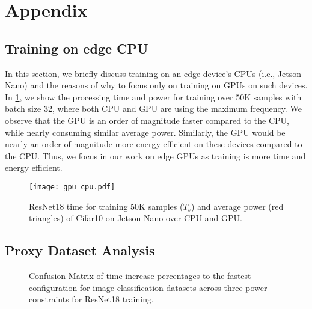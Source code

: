 \clearpage
\appendix


\section{Appendix}

\subsection{Training on edge CPU}
\label{appendix:CPU_training}
In this section, we briefly discuss training on an edge device's CPUs (i.e., Jetson Nano) and the reasons of why to focus only on training on GPUs on such devices. In \cref{fig:cpu_gpu_latency}, we show the processing time and power for training over 50K samples with batch size 32, where both CPU and GPU are using the maximum frequency. We observe that the GPU is an order of magnitude faster compared to the CPU, while nearly consuming similar average power. Similarly, the GPU would be nearly an order of magnitude more energy efficient on these devices compared to the CPU. Thus, we focus in our work on edge GPUs as training is more time and energy efficient.  

\begin{figure}[htb!]
    \centering
    \texttt{[image: gpu\_cpu.pdf]}
    \label{fig:cpu_gpu_latency}
    \caption{ResNet18 time for training 50K samples ($T_s$) and average power (red triangles) of Cifar10 on Jetson Nano over CPU and GPU.}
 
\end{figure}



\subsection{Proxy Dataset Analysis}
\label{appendix:proxy_dataset_extension}

\begin{figure*}
    \centering
    \caption{Confusion Matrix of time increase percentages to the fastest configuration for image classification datasets across three power constraints for ResNet18 training.}
    \label{fig:confusion_matrix_resnet18}
\end{figure*}




